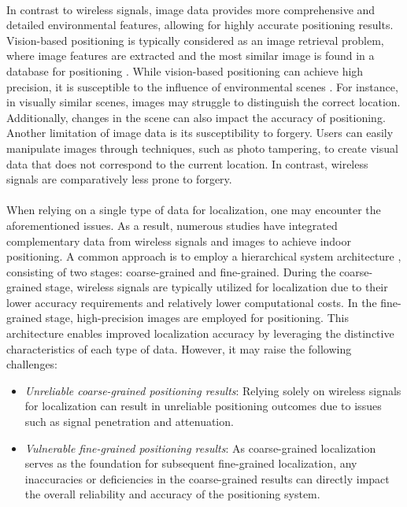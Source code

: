 \documentclass[a4paper,12pt]{report}
\begin{document}
\paragraph{}
In contrast to wireless signals, image data provides more comprehensive and detailed environmental features, allowing for highly accurate positioning results. Vision-based positioning is typically considered as an image retrieval problem, where image features are extracted and the most similar image is found in a database for positioning \cite{laskar2017camera,balntas2018relocnet,xu2019robust}. While vision-based positioning can achieve high precision, it is susceptible to the influence of environmental scenes \cite{stenborg2020using,dubenova2022d}. For instance, in visually similar scenes, images may struggle to distinguish the correct location. Additionally, changes in the scene can also impact the accuracy of positioning. Another limitation of image data is its susceptibility to forgery. Users can easily manipulate images through techniques, such as photo tampering, to create visual data that does not correspond to the current location. In contrast, wireless signals are comparatively less prone to forgery.
\paragraph{}
When relying on a single type of data for localization, one may encounter the aforementioned issues. As a result, numerous studies have integrated complementary data from wireless signals and images to achieve indoor positioning. A common approach is to employ a hierarchical system architecture \cite{guo2018fusion,wang2020joint,huang2020wifi,park2022fi,tang2023sequential}, consisting of two stages: coarse-grained and fine-grained. During the coarse-grained stage, wireless signals are typically utilized for localization due to their lower accuracy requirements and relatively lower computational costs. In the fine-grained stage, high-precision images are employed for positioning. This architecture enables improved localization accuracy by leveraging the distinctive characteristics of each type of data. However, it may raise the following challenges:
\begin{itemize}
    \item \emph{Unreliable coarse-grained positioning results}: Relying solely on wireless signals for localization can result in unreliable positioning outcomes due to issues such as signal penetration and attenuation.
    \item \emph{Vulnerable fine-grained positioning results}: As coarse-grained localization serves as the foundation for subsequent fine-grained localization, any inaccuracies or deficiencies in the coarse-grained results can directly impact the overall reliability and accuracy of the positioning system.
\end{itemize}
\end{document}
